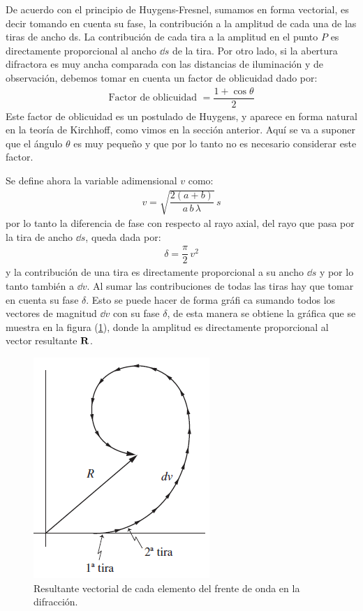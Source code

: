 \documentclass[14pt]{extarticle}
\begin{document}
De acuerdo con el principio de Huygens-Fresnel, sumamos en forma vectorial, es decir tomando en cuenta su fase, la contribución a la amplitud de cada una de las tiras de ancho ds. La contribución de cada tira a la amplitud en el punto $P$ es directamente proporcional al ancho $\dd{s}$ de la tira. Por otro lado, si la abertura difractora es muy ancha comparada con las distancias de iluminación y de observación, debemos tomar en cuenta un factor de oblicuidad dado por:
\begin{align}
\text{Factor de oblicuidad } = \dfrac{1 + \cos \theta}{2}
\label{eq:ecuacion_X_13}
\end{align}
Este factor de oblicuidad es un postulado de Huygens, y aparece en forma natural en la teoría de Kirchhoff, como vimos en la sección anterior. Aquí se va a suponer que el ángulo $\theta$ es muy pequeño y que por lo tanto no es necesario considerar este factor.
\par
Se define ahora la variable adimensional $v$ como:
\begin{align}
v = \sqrt{\dfrac{2 (a + b)}{a \, b \, \lambda}} \, s
\label{eq:ecuacion_X_14}
\end{align}
por lo tanto la diferencia de fase con respecto al rayo axial, del rayo que pasa por la tira de ancho $\dd{s}$, queda dada por:
\begin{align}
\delta = \dfrac{\pi}{2} \, v^{2}
\label{eq:ecuacion_X_15}
\end{align}
y la contribución de una tira es directamente proporcional a su ancho $\dd{s}$ y por lo tanto también a $\dd{v}$. Al sumar las contribuciones de todas las tiras hay que tomar en cuenta su fase $\delta$. Esto se puede hacer de forma gráfi ca sumando todos los vectores de magnitud $\dd{v}$ con su fase $\delta$, de esta manera se obtiene la gráfica que se muestra en la figura (\ref{fig:figura_X_06}), donde la amplitud es directamente proporcional al vector resultante $\vb{R}$.
\begin{figure}[H]
    \centering
    \includegraphics[scale=1]{Imagenes/Difraccion_06.png}
    \caption{Resultante vectorial de cada elemento del frente de onda en la difracción.}
    \label{fig:figura_X_06}
\end{figure}
\end{document}
